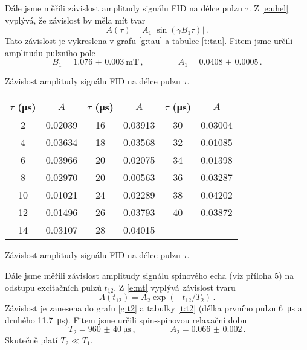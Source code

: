 Dále jsme měřili závislost amplitudy signálu FID na délce pulzu $\tau$. Z \eqref{e:uhel} vyplývá, že závislost by měla mít tvar
\begin{equation*}
A(\tau)=A_1 |\sin(\gamma B_1 \tau) | \,.
\end{equation*}
Tato závislost je vykreslena v grafu \ref{g:tau} a tabulce \ref{t:tau}.
Fitem jsme určili amplitudu pulzního pole
\begin{equation*}
B_1=\SI{1.076(3)}{\milli\tesla}  \,,\qquad \qquad A_1 = \num{0.0408(5)} \,.
\end{equation*}

\begin{graph}[htbp] 
\centering

\caption{Závislost amplitudy signálu FID na délce pulzu $\tau$.}
\label{g:tau}
\end{graph}

\begin{tabulka}[htbp]
\centering
\begin{tabular}{cc|cc|cc}
$\tau$ (\si{\us}) & $A$ & $\tau$ (\si{\us}) & $A$ & $\tau$ (\si{\us}) & $A$ \\\hline
2 & \num{0.02039}  & 16 & \num{0.03913}  & 30 & \num{0.03004}\\
4 & \num{0.03634}  & 18 & \num{0.03568}  & 32 & \num{0.01085}\\
6 & \num{0.03966}  & 20 & \num{0.02075}  & 34 & \num{0.01398}\\
8 & \num{0.02970}  & 20 & \num{0.00563}  & 36 & \num{0.03287}\\
10 & \num{0.01021} & 24 & \num{0.02289}  & 38 & \num{0.04202}\\
12 & \num{0.01496} & 26 & \num{0.03793}  & 40 & \num{0.03872}\\
14 & \num{0.03107} & 28 & \num{0.04015}  & & \\
\end{tabular}
\caption{Závislost amplitudy signálu FID na délce pulzu $\tau$.}
\label{t:tau}
\end{tabulka}

Dále jsme měřili závislost amplitudy signálu spinového echa (viz příloha 5) na odstupu excitačních pulzů $t_{12}$. Z \eqref{e:mt} vyplývá závislost tvaru
\begin{equation*}
A(t_{12})=A_2 \exp(-t_{12}/T_2) \,.
\end{equation*}
Závislost je zanesena do grafu \ref{g:t2} a tabulky \ref{t:t2} (délka prvního pulzu \SI{6}{\us} a druhého \SI{11.7}{\us}).
Fitem jsme určili spin-spinovou relaxační dobu
\begin{equation*}
T_2=\SI{960(40)}{\us}  \,,\qquad \qquad A_2 = \num{0.066(2)} \,.
\end{equation*}
Skutečně platí $T_2 \ll T_1$.


